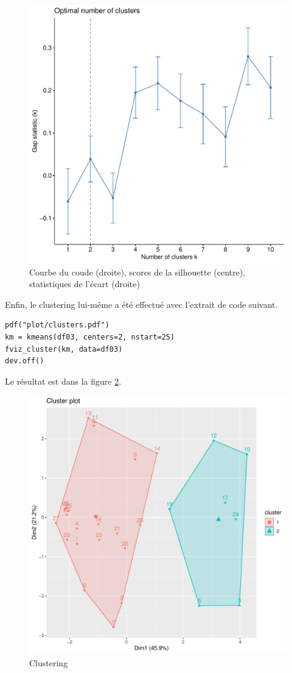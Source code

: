\documentclass[11pt]{article}
\begin{document}
\begin{figure}[h]
  \includegraphics[scale=0.3]{../plot/kmeans-gap-stat.pdf}
  \caption{Courbe du coude (droite), scores de la silhouette (centre), statistiques de l'écart (droite)}
  \label{fig:cluster-count}
\end{figure}
Enfin, le clustering lui-même a été effectué avec l'extrait de code suivant.
\begin{verbatim}
pdf("plot/clusters.pdf")
km = kmeans(df03, centers=2, nstart=25)
fviz_cluster(km, data=df03)
dev.off()
\end{verbatim}
Le résultat est dans la figure \ref{fig:clusters}.
\begin{figure}[h]
  \centering
  \includegraphics[scale=0.4]{../plot/clusters.pdf}
  \caption{Clustering}
  \label{fig:clusters}
\end{figure}
\end{document}
